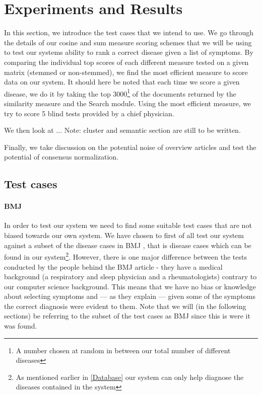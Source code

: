 \chapter{Experiments and Results\label{ExperimentsResults}}

In this section, we introduce the test cases that we intend to use. We go
through the details of our cosine and sum measure scoring schemes that
we will be using to test our systems ability to rank a correct disease
given a list of symptoms. By comparing the individual top scores of 
each different measure tested on a given matrix
(stemmed or non-stemmed), we find the most efficient measure to score
data on our system. It should here be noted that each time we score a
given disease, we do it by taking the top 3000\footnote{A number
  chosen at random in between our total number of different diseases}
of the documents returned by the similarity measure and the Search
module. Using the most efficient measure, we try to score 5
blind tests provided by a chief physician.

We then look at  ... Note: cluster and
semantic section are still to be written.

Finally, we take discussion on the potential noise of overview
articles and test the potential of consensus normalization.

\section{Test cases}

\subsubsection{BMJ}
In order to test our system we need to find some suitable test cases
that are not biased towards our own system. We have chosen to first of
all test our system against a subset of the disease cases in BMJ
\cite{HangwiTang11102006}, that is disease cases which can be found in
our system\footnote{As mentioned earlier in \ref{Database} our system
  can only help diagnose the diseases contained in the
  system}. However, there is one major difference between the tests
conducted by the people behind the BMJ article - they have a medical
background (a respiratory and sleep physician and a rheumatologists)
contrary to our computer science background. This means that we have
no bias or knowledge about selecting symptoms and --- as they explain ---
given some of the symptoms the correct diagnosis were evident to
them. Note that we will (in the following sections) be referring to
the subset of the test cases as BMJ since this is were it was
found.

